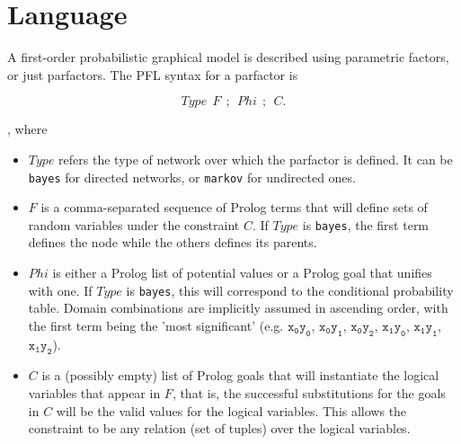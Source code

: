 \documentclass{article}
\begin{document}
\section{Language}
A first-order probabilistic graphical model is described using parametric factors, or just parfactors. The PFL syntax for a parfactor is

$$Type~~F~~;~~Phi~~;~~C.$$

, where
\begin{itemize}
\item $Type$ refers the type of network over which the parfactor is defined. It can be \texttt{bayes} for directed networks, or \texttt{markov} for undirected ones.

\item $F$ is a comma-separated sequence of Prolog terms that will define sets of random variables under the constraint $C$. If $Type$ is \texttt{bayes}, the first term defines the node while the others defines its parents.

\item $Phi$ is either a Prolog list of potential values or a Prolog goal that unifies with one. If $Type$ is \texttt{bayes}, this will correspond to the conditional probability table. Domain combinations are implicitly assumed in ascending order, with the first term being the 'most significant' (e.g. $\mathtt{x_0y_0}$, $\mathtt{x_0y_1}$, $\mathtt{x_0y_2}$, $\mathtt{x_1y_0}$, $\mathtt{x_1y_1}$, $\mathtt{x_1y_2}$).

\item $C$ is a (possibly empty) list of Prolog goals that will instantiate the logical variables that appear in $F$, that is, the successful substitutions for the goals in $C$ will be the valid values for the logical variables. This allows the constraint to be any relation (set of tuples) over the logical variables.
\end{itemize}
\end{document}
